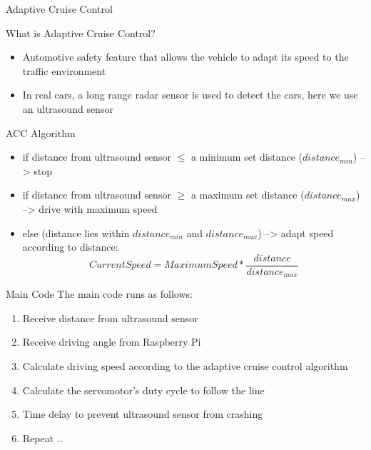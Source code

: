 \begin{frame}[plain]{Adaptive Cruise Control}

What is Adaptive Cruise Control?
\pause
\begin{itemize}
	\item Automotive safety feature that allows the vehicle to adapt its speed to the traffic environment 
	\pause
	\item In real cars, a long range radar sensor is used to detect the cars, here we use an ultrasound sensor
\end{itemize}
\pause	
\vspace{1cm}
ACC Algorithm
\pause
\begin{itemize}
	\item if distance from ultrasound sensor $\leq$ a minimum set distance ($distance_{min}$) --> stop
	\pause
	\item if distance from ultrasound sensor $\geq$ a maximum set distance ($distance_{max}$) --> drive with maximum speed
	\pause
	\item else (distance lies within $distance_{min}$ and $distance_{max}$) --> adapt speed according to distance:
	\pause
	$$Current Speed = Maximum Speed * \frac{distance}{distance_{max}}$$
\end{itemize}
\end{frame}


\begin{frame}[plain]{Main Code}
The main code runs as follows:
\begin{enumerate}
\item Receive distance from ultrasound sensor 
\pause
\item Receive driving angle from Raspberry Pi
\pause
\item Calculate driving speed according to the adaptive cruise control algorithm
\pause
\item Calculate the servomotor's duty cycle to follow the line
\pause
\item Time delay to prevent ultrasound sensor from crashing
\pause
\item Repeat ..
\end{enumerate}
\end{frame}
